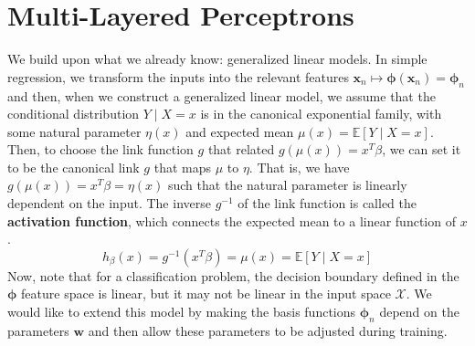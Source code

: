 \section{Multi-Layered Perceptrons} 

  We build upon what we already know: generalized linear models. In simple regression, we transform the inputs into the relevant features $\mathbf{x}_n \mapsto \boldsymbol{\phi} (\mathbf{x}_n) = \boldsymbol{\phi}_n$ and then, when we construct a generalized linear model, we assume that the conditional distribution $Y \mid X = x$ is in the canonical exponential family, with some natural parameter $\eta(x)$ and expected mean $\mu(x) = \mathbb{E}[Y \mid X = x]$. Then, to choose the link function $g$ that related $g(\mu(x)) = x^T \beta$, we can set it to be the canonical link $g$ that maps $\mu$ to $\eta$. That is, we have $g(\mu(x)) = x^T \beta = \eta (x)$ such that the natural parameter is linearly dependent on the input. The inverse $g^{-1}$ of the link function is called the \textbf{activation function}, which connects the expected mean to a linear function of $x$. 
  \begin{equation}
    h_\beta (x) = g^{-1} (x^T \beta) = \mu(x) = \mathbb{E}[Y \mid X = x]
  \end{equation}
  Now, note that for a classification problem, the decision boundary defined in the $\boldsymbol{\phi}$ feature space is linear, but it may not be linear in the input space $\mathcal{X}$. We would like to extend this model by making the basis functions $\boldsymbol{\phi}_n$ depend on the parameters $\mathbf{w}$ and then allow these parameters to be adjusted during training. 

